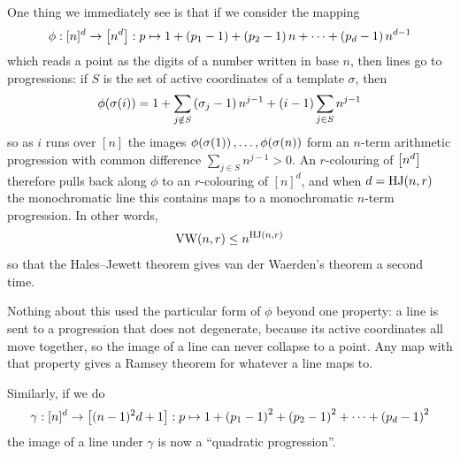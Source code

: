 One thing we immediately see is that if we consider the mapping
\begin{align*}
    \phi : [n]^d \to \left[ n^d \right] : p \mapsto 1 + \left( p_1 - 1 \right) + \left( p_2 - 1 \right) n + \cdots + \left( p_d - 1 \right) n^{d - 1}
\end{align*}
which reads a point as the digits of a number written in base $n$, then lines go to progressions: if $S$ is the set of active coordinates of a template $\sigma$, then
\begin{align*}
    \phi\!\left( \sigma(i) \right) = 1 + \sum_{j \notin S} \left( \sigma_j - 1 \right) n^{j - 1} + \left( i - 1 \right) \sum_{j \in S} n^{j - 1}
\end{align*}
so as $i$ runs over $[n]$ the images $\phi\!\left( \sigma(1) \right), \ldots, \phi\!\left( \sigma(n) \right)$ form an $n$-term arithmetic progression with common difference $\sum_{j \in S} n^{j - 1} > 0$. An $r$-colouring of $\left[ n^d \right]$ therefore pulls back along $\phi$ to an $r$-colouring of $[n]^d$, and when $d = \operatorname{HJ}(n, r)$ the monochromatic line this contains maps to a monochromatic $n$-term progression. In other words,
\begin{align*}
    \operatorname{VW}(n, r) \leq n^{\operatorname{HJ}(n, r)}
\end{align*}
so that the Hales--Jewett theorem gives van der Waerden's theorem a second time.

Nothing about this used the particular form of $\phi$ beyond one property: a line is sent to a progression that does not degenerate, because its active coordinates all move together, so the image of a line can never collapse to a point. Any map with that property gives a Ramsey theorem for whatever a line maps to.

Similarly, if we do
\begin{align*}
    \gamma : [n]^d \to \left[ (n - 1)^2 d + 1 \right] : p \mapsto 1 + \left( p_1 - 1 \right)^2 + \left( p_2 - 1 \right)^2 + \cdots + \left( p_d - 1 \right)^2
\end{align*}
the image of a line under $\gamma$ is now a ``quadratic progression''.
